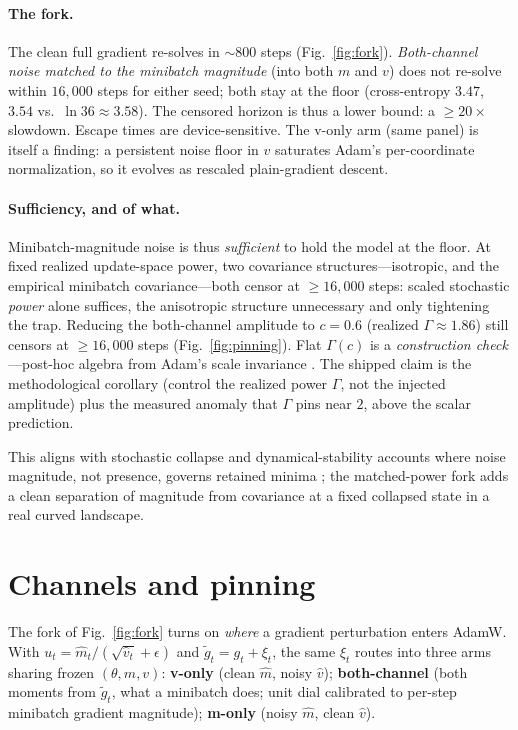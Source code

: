 \documentclass[10pt]{article}
\begin{document}
\paragraph{The fork.}
The clean full gradient re-solves in ${\sim}800$ steps (Fig.~\ref{fig:fork}). \emph{Both-channel noise matched to the minibatch magnitude} (into both $m$ and $v$) does not re-solve within $16{,}000$ steps for either seed; both stay at the floor (cross-entropy $3.47$, $3.54$ vs.\ $\ln 36 \approx 3.58$). The censored horizon is thus a lower bound: a $\ge 20\times$ slowdown. Escape times are device-sensitive. The v-only arm (same panel) is itself a finding: a persistent noise floor in $v$ saturates Adam's per-coordinate normalization, so it evolves as rescaled plain-gradient descent.

\paragraph{Sufficiency, and of what.}
Minibatch-magnitude noise is thus \emph{sufficient} to hold the model at the floor. At fixed realized update-space power, two covariance structures---isotropic, and the empirical minibatch covariance---both censor at $\ge 16{,}000$ steps: scaled stochastic \emph{power} alone suffices, the anisotropic structure unnecessary and only tightening the trap. Reducing the both-channel amplitude to $c=0.6$ (realized $\Gamma\approx1.86$) still censors at $\ge 16{,}000$ steps (Fig.~\ref{fig:pinning}). Flat $\Gamma(c)$ is a \emph{construction check}---post-hoc algebra from Adam's scale invariance \citep{adam}. The shipped claim is the methodological corollary (control the realized power $\Gamma$, not the injected amplitude) plus the measured anomaly that $\Gamma$ pins near $2$, above the scalar prediction.

This aligns with stochastic collapse \citep{stochcollapse} and dynamical-stability accounts where noise magnitude, not presence, governs retained minima \citep{wumae,eoss}; the matched-power fork adds a clean separation of magnitude from covariance \citep{zhu} at a fixed collapsed state in a real curved landscape.


\section{Channels and pinning}
\label{sec:pinning}

The fork of Fig.~\ref{fig:fork} turns on \emph{where} a gradient perturbation
enters AdamW. With $u_t=\hat m_t/(\sqrt{\hat v_t}+\epsilon)$ and
$\tilde g_t=g_t+\xi_t$, the same $\xi_t$ routes into three arms sharing frozen
$(\theta,m,v)$: \textbf{v-only} (clean $\hat m$, noisy $\hat v$);
\textbf{both-channel} (both moments from $\tilde g_t$, what a minibatch does; unit
dial calibrated to per-step minibatch gradient magnitude); \textbf{m-only} (noisy
$\hat m$, clean $\hat v$).
\end{document}
